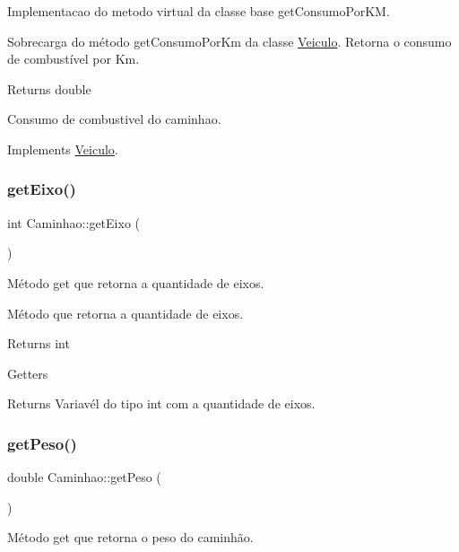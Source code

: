 Implementacao do metodo virtual da classe base \textquotesingle{}get\+Consumo\+Por\+KM\textquotesingle{}. 

Sobrecarga do método get\+Consumo\+Por\+Km da classe \hyperlink{classVeiculo}{Veiculo}. Retorna o consumo de combustível por Km.

\begin{DoxyReturn}{Returns}
double

Consumo de combustivel do caminhao. 
\end{DoxyReturn}


Implements \hyperlink{classVeiculo}{Veiculo}.

\mbox{\label{classCaminhao_a2f23320651bb9eacb11ac5b260241456}} 
\subsubsection{\texorpdfstring{get\+Eixo()}{getEixo()}}
{\footnotesize\ttfamily int Caminhao\+::get\+Eixo (\begin{DoxyParamCaption}{ }\end{DoxyParamCaption})}



Método get que retorna a quantidade de eixos. 

Método que retorna a quantidade de eixos. \begin{DoxyReturn}{Returns}
int
\end{DoxyReturn}
Getters \begin{DoxyReturn}{Returns}
Variavél do tipo int com a quantidade de eixos. 
\end{DoxyReturn}
\mbox{\label{classCaminhao_a309d69ad26e53f1d704a2878b2c7b17a}} 
\subsubsection{\texorpdfstring{get\+Peso()}{getPeso()}}
{\footnotesize\ttfamily double Caminhao\+::get\+Peso (\begin{DoxyParamCaption}{ }\end{DoxyParamCaption})}



Método get que retorna o peso do caminhão. 

